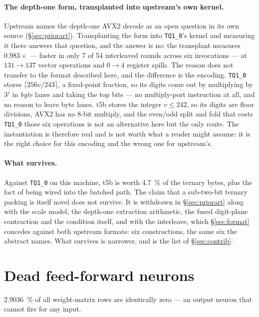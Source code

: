 \documentclass[11pt,a4paper]{article}
\newcommand{\code}[1]{\texttt{#1}}
\begin{document}
\paragraph{The depth-one form, transplanted into upstream's own kernel.}
Upstream names the depth-one AVX2 decode as an open question in its own source
(\S\ref{sec:priorart}). Transplanting the form into \code{TQ1\_0}'s kernel and
measuring it there answers that question, and the answer is no: the transplant
measures $\num{0.983}\times$ --- faster in only 7
of 54 interleaved rounds across six invocations --- at $131\to137$ vector
operations and $0\to4$ register spills. The reason does not transfer to
the format described here, and the difference is the encoding.
\code{TQ1\_0} stores $\lceil 256v/243\rceil$, a fixed-point fraction, so
its digits come out by multiplying by $3^{j}$ in \emph{byte} lanes and
taking the top bits --- no multiply-port instruction at all, and no reason
to leave byte lanes. t5b stores the integer $v\le\num{242}$, so its digits
are floor divisions, AVX2 has no 8-bit multiply, and the even/odd split
and fold that costs \code{TQ1\_0} those six operations is not an
alternative here but the only route. The instantiation is therefore real
and is not worth what a reader might assume: it is the right choice for
this encoding and the wrong one for upstream's.

\paragraph{What survives.} Against \code{TQ1\_0} on this machine, t5b is worth
\SI{4.7}{\percent} of the ternary bytes, plus the fact of being wired into the
batched path. The claim that a sub-two-bit ternary packing is itself novel does
not survive. It is withdrawn in \S\ref{sec:priorart} along with the scale
model, the depth-one extraction arithmetic, the fused digit-plane contraction
and the condition itself, and with the interleave, which \S\ref{sec:format}
concedes against both upstream formats: six constructions, the same six the
abstract names. What survives is narrower, and is the list of
\S\ref{sec:contrib}.

\section{Dead feed-forward neurons}\label{sec:dead}

\SI{2.9036}{\percent} of all weight-matrix rows are identically zero --- an
output neuron that cannot fire for any input.
\end{document}
